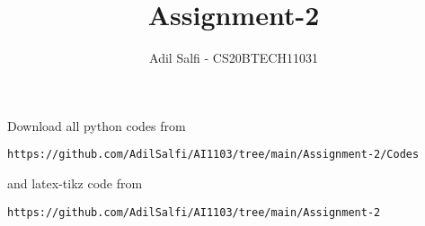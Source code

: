 \documentclass[journal,12pt,twocolumn]{IEEEtran}
\DeclareMathOperator*{\Res}{Res}
\begin{document}
\newtheorem{theorem}{Theorem}[section]
\newtheorem{problem}{Problem}
\newtheorem{proposition}{Proposition}[section]
\newtheorem{lemma}{Lemma}[section]
\newtheorem{corollary}[theorem]{Corollary}
\newtheorem{example}{Example}[section]
\newtheorem{definition}[problem]{Definition}

\newcommand{\BEQA}{\begin{eqnarray}}
\newcommand{\EEQA}{\end{eqnarray}}
\newcommand{\define}{\stackrel{\triangle}{=}}

\raggedbottom
\setlength{\parindent}{0pt}
\providecommand{\mbf}{\mathbf}
\providecommand{\pr}[1]{\ensuremath{\Pr\left(#1\right)}}
\providecommand{\qfunc}[1]{\ensuremath{Q\left(#1\right)}}
\providecommand{\sbrak}[1]{\ensuremath{{}\left[#1\right]}}
\providecommand{\lsbrak}[1]{\ensuremath{{}\left[#1\right.}}
\providecommand{\rsbrak}[1]{\ensuremath{{}\left.#1\right]}}
\providecommand{\brak}[1]{\ensuremath{\left(#1\right)}}
\providecommand{\lbrak}[1]{\ensuremath{\left(#1\right.}}
\providecommand{\rbrak}[1]{\ensuremath{\left.#1\right)}}
\providecommand{\cbrak}[1]{\ensuremath{\left\{#1\right\}}}
\providecommand{\lcbrak}[1]{\ensuremath{\left\{#1\right.}}
\providecommand{\rcbrak}[1]{\ensuremath{\left.#1\right\}}}
\theoremstyle{remark}
\newtheorem{rem}{Remark}
\newcommand{\sgn}{\mathop{\mathrm{sgn}}}
\providecommand{\res}[1]{\Res\displaylimits_{#1}} 
\providecommand{\mtx}[1]{\mathbf{#1}}
\providecommand{\fourier}{\overset{\mathcal{F}}{ \rightleftharpoons}}
\providecommand{\system}{\overset{\mathcal{H}}{ \longleftrightarrow}}
\newcommand{\solution}{\noindent \textbf{Solution: }}
\newcommand{\cosec}{\,\text{cosec}\,}
\providecommand{\dec}[2]{\ensuremath{\overset{#1}{\underset{#2}{\gtrless}}}}
\newcommand{\myvec}[1]{\ensuremath{\begin{pmatrix}#1\end{pmatrix}}}
\newcommand{\mydet}[1]{\ensuremath{\begin{vmatrix}#1\end{vmatrix}}}
\makeatletter
{}
\makeatother
\let\StandardTheFigure\thefigure
\let\vec\mathbf
\renewcommand{\thefigure}{\theproblem}
\def\putbox#1#2#3{\makebox[0in][l]{\makebox[#1][l]{}\raisebox{\baselineskip}[0in][0in]{\raisebox{#2}[0in][0in]{#3}}}}
     \def\rightbox#1{\makebox[0in][r]{#1}}
     \def\centbox#1{\makebox[0in]{#1}}
     \def\topbox#1{\raisebox{-\baselineskip}[0in][0in]{#1}}
     \def\midbox#1{\raisebox{-0.5\baselineskip}[0in][0in]{#1}}
\title{Assignment-2}
\author{Adil Salfi  - CS20BTECH11031}
\maketitle
Download all python codes from
\begin{lstlisting}
https://github.com/AdilSalfi/AI1103/tree/main/Assignment-2/Codes
\end{lstlisting}
and latex-tikz code from
\begin{lstlisting}
https://github.com/AdilSalfi/AI1103/tree/main/Assignment-2
\end{lstlisting}
\end{document}
